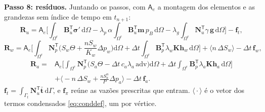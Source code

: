 \documentclass[11pt,a4paper]{article}
\numberwithin{equation}{section}
\newcommand{\dd}{\mathrm{d}}
\newcommand{\sig}{\boldsymbol\sigma}
\newcommand{\pabs}{P}
\newcommand{\cond}[1]{\big\langle #1\big\rangle}
\begin{document}
\textbf{Passo 8: resíduos.} Juntando os passos, com $\mathsf A_e$ a montagem dos elementos e as grandezas sem índice de
tempo em $t_{n+1}$:
\begin{equation}
\boxed{\mathbf R_u=\mathsf A_e\Big[\int_{\Omega^e}\mathbf B_u^{\mathsf T}\sig'\,\dd\Omega
-\lambda_p\,\alpha\int_{\Omega^e}\mathbf B_u^{\mathsf T}\mathbf m\,p_B\,\dd\Omega
-\lambda_g\int_{\Omega^e}\mathbf N_u^{\mathsf T}\gamma\,\mathbf g\,\dd\Omega\Big]-\mathbf f_t,}
\label{eq:Ru}
\end{equation}
\begin{equation}
\boxed{\mathbf R_w=\mathsf A_e\Big[\int_{\Omega^e}\mathbf N_p^{\mathsf T}\Big(S_w\Theta+\frac{nS_w}{K_w}\Delta p_w\Big)\dd\Omega
+\Delta t\int_{\Omega^e}\mathbf B_p^{\mathsf T}\lambda_w\mathbf K\mathbf h_w\,\dd\Omega\Big]
+\cond{n\,\Delta S_w}-\Delta t\,\mathbf f_w,}
\label{eq:Rw}
\end{equation}
\begin{equation}
\boxed{\begin{aligned}\mathbf R_a={}&\mathsf A_e\Big[\int_{\Omega^e}\mathbf N_p^{\mathsf T}\big(S_a\Theta-\Delta t\,c_a\lambda_a\,\mathrm{adv}\big)\dd\Omega
+\Delta t\int_{\Omega^e}\mathbf B_p^{\mathsf T}\lambda_a\mathbf K\mathbf h_a\,\dd\Omega\Big]\\
&+\cond{-n\,\Delta S_w+\frac{nS_a^n}{\pabs}\Delta p_a}-\Delta t\,\mathbf f_a .\end{aligned}}
\label{eq:Ra}
\end{equation}
$\mathbf f_t=\int_{\Gamma_t}\mathbf N_u^{\mathsf T}\bar{\mathbf t}\,\dd\Gamma$, e $\mathbf f_\pi$ reúne as vazões prescritas que
entram. $\cond{\cdot}$ é o vetor dos termos condensados \eqref{eq:conddef}, um por vértice.
\end{document}
